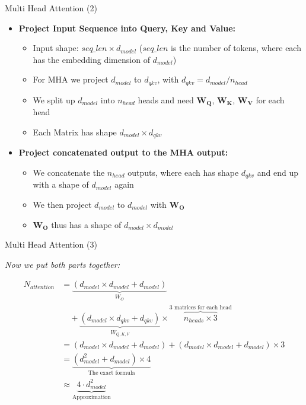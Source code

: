 \documentclass[11pt,compress,t,notes=noshow, xcolor=table]{beamer}
\begin{document}
\begin{frame}{Multi Head Attention (2)}

\begin{itemize}
    \item \textbf{Project Input Sequence into Query, Key and Value:}
        \begin{itemize}
            \item Input shape: $seq\_len\times d_{model}$ ($seq\_len$ is the number of tokens, where each has the embedding dimension of $d_{model}$)
            \item For MHA we project $d_{model}$ to $d_{qkv}$, with $d_{qkv} = d_{model}/n_{head}$ \item We split up $d_{model}$ into $n_{head}$ heads and need $\boldsymbol{W_Q}$, $\boldsymbol{W_K}$, $\boldsymbol{W_V}$ for each head
            \item Each Matrix has shape $d_{model} \times d_{qkv}$
        \end{itemize}
    \vfill
    \item \textbf{Project concatenated output to the MHA output:}
        \begin{itemize}
            \item We concatenate the $n_{head}$ outputs, where each has shape $d_{qkv}$ and end up with a shape of $d_{model}$ again
            \item We then project $d_{model}$ to $d_{model}$ with $\boldsymbol{W_O}$
            \item $\boldsymbol{W_O}$ thus has a shape of $d_{model} \times d_{model}$
        \end{itemize}
\end{itemize}
    
\end{frame}


\begin{frame}{Multi Head Attention (3)}

\textit{Now we put both parts together:}

$$
\begin{aligned}
N_{attention} &= \underbrace{(d_{model} \times d_{model} + d_{model})}_{W_O} \\
&\quad + \underbrace{(d_{model} \times d_{qkv} + d_{qkv})}_{W_{Q,K,V}} \times \overbrace{n_{heads} \times 3}^{\text{3 matrices for each head}} \\
&= (d_{model} \times d_{model} + d_{model}) + (d_{model} \times d_{model} + d_{model}) \times 3 \\
&= \underbrace{(d_{model}^2 + d_{model}) \times 4}_{\text{The exact formula}} \\
&\approx \underbrace{4 \cdot d_{model}^2}_{\text{Approximation}}
\end{aligned}
$$

\end{frame}
\end{document}
